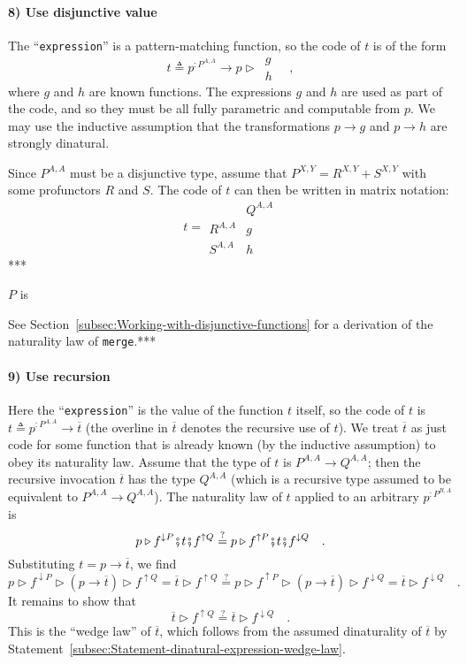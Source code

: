 \paragraph{8) Use disjunctive value }

The \textsf{``}\lstinline!expression!\textsf{''} is a pattern-matching function,
so the code of $t$ is of the form 
\[
t\triangleq p^{:P^{A,A}}\rightarrow p\triangleright\,\begin{array}{||c|}
g\\
h
\end{array}\quad,
\]
where $g$ and $h$ are known functions. The expressions $g$ and
$h$ are used as part of the code, and so they must be all fully parametric
and computable from $p$. We may use the inductive assumption that
the transformations $p\rightarrow g$ and $p\rightarrow h$ are strongly
dinatural.

Since $P^{A,A}$ must be a disjunctive type, assume that $P^{X,Y}=R^{X,Y}+S^{X,Y}$
with some profunctors $R$ and $S$. The code of $t$ can then be
written in matrix notation:
\[
t=\begin{array}{|c||c|}
 & Q^{A,A}\\
\hline R^{A,A} & g\\
S^{A,A} & h
\end{array}
\]
{*}{*}{*} 

$P$ is 

See Section~\ref{subsec:Working-with-disjunctive-functions} for
a derivation of the naturality law of \lstinline!merge!.{*}{*}{*} 

\paragraph{9) Use recursion}

Here the \textsf{``}\lstinline!expression!\textsf{''} is the value of the function
$t$ itself, so the code of $t$ is $t\triangleq p^{:P^{A,A}}\rightarrow\overline{t}$
(the overline in $\overline{t}$ denotes the recursive use of $t$).
We treat $\overline{t}$ as just code for some function that is already
known (by the inductive assumption) to obey its naturality law. Assume
that the type of $t$ is $P^{A,A}\rightarrow Q^{A,A}$; then the recursive
invocation $\overline{t}$ has the type $Q^{A,A}$ (which is a recursive
type assumed to be equivalent to $P^{A,A}\rightarrow Q^{A,A}$). The
naturality law of $t$ applied to an arbitrary $p^{:P^{B,A}}$ is
\[
p\triangleright f^{\downarrow P}\bef t\bef f^{\uparrow Q}\overset{?}{=}p\triangleright f^{\uparrow P}\bef t\bef f^{\downarrow Q}\quad.
\]
Substituting $t=p\rightarrow\overline{t}$, we find
\[
p\triangleright f^{\downarrow P}\triangleright(p\rightarrow\overline{t})\triangleright f^{\uparrow Q}=\overline{t}\triangleright f^{\uparrow Q}\overset{?}{=}p\triangleright f^{\uparrow P}\triangleright(p\rightarrow\overline{t})\triangleright f^{\downarrow Q}=\overline{t}\triangleright f^{\downarrow Q}\quad.
\]
It remains to show that 
\[
\overline{t}\triangleright f^{\uparrow Q}\overset{?}{=}\overline{t}\triangleright f^{\downarrow Q}\quad.
\]
This is the \textsf{``}wedge law\textsf{''} of $\overline{t}$, which follows from
the assumed dinaturality of $\overline{t}$ by Statement~\ref{subsec:Statement-dinatural-expression-wedge-law}.

